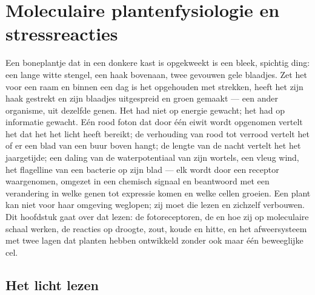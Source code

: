 \chapter{Moleculaire plantenfysiologie en stressreacties}\label{ch:b3:plant-molecular-physiology}

Een boneplantje dat in een donkere kast is opgekweekt is een bleek,
spichtig ding: een lange witte stengel, een haak bovenaan, twee
gevouwen gele blaadjes. Zet het voor een raam en binnen een dag is het
opgehouden met strekken, heeft het zijn haak gestrekt en zijn blaadjes
uitgespreid en groen gemaakt --- een ander organisme, uit dezelfde
genen. Het had niet op energie gewacht; het had op informatie gewacht.
Eén rood foton dat door één eiwit wordt opgenomen vertelt het dat het
het licht heeft bereikt; de verhouding van rood tot verrood vertelt het
of er een blad van een buur boven hangt; de lengte van de nacht vertelt
het het jaargetijde; een daling van de waterpotentiaal van zijn
wortels, een vleug wind, het flagelline van een bacterie op zijn blad
--- elk wordt door een receptor waargenomen, omgezet in een chemisch
signaal en beantwoord met een verandering in welke genen tot expressie
komen en welke cellen groeien. Een plant kan niet voor haar omgeving
weglopen; zij moet die lezen en zichzelf verbouwen. Dit hoofdstuk gaat
over dat lezen: de fotoreceptoren, de  en hoe zij op
moleculaire schaal werken, de reacties op droogte, zout, koude en
hitte, en het afweersysteem met twee lagen dat planten hebben
ontwikkeld zonder ook maar één beweeglijke cel.

\section{Het licht lezen}

